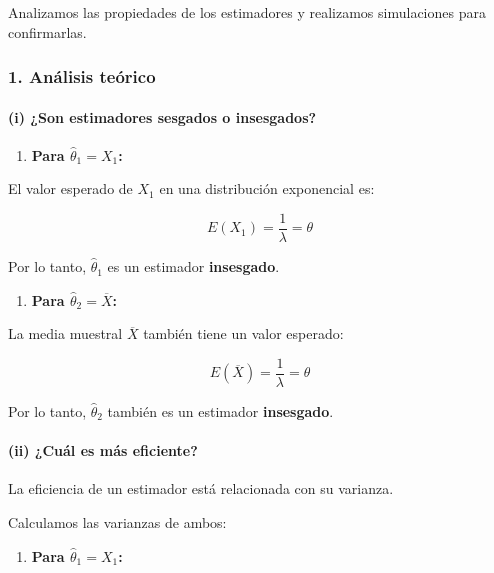 \documentclass[
]{article}
\providecommand{\tightlist}{%
  \setlength{\itemsep}{0pt}\setlength{\parskip}{0pt}}
\begin{document}
Analizamos las propiedades de los estimadores y realizamos simulaciones para confirmarlas.

\subsubsection{1. Análisis teórico}\label{anuxe1lisis-teuxf3rico}

\paragraph{(i) ¿Son estimadores sesgados o insesgados?}\label{i-son-estimadores-sesgados-o-insesgados}

\begin{enumerate}
\def\labelenumi{\arabic{enumi}.}
\tightlist
\item
  \textbf{Para \(\hat\theta_1 = X_1\):}
\end{enumerate}

El valor esperado de \(X_1\) en una distribución exponencial es:

\[
E(X_1) = \frac{1}{\lambda} = \theta
\]

Por lo tanto, \(\hat\theta_1\) es un estimador \textbf{insesgado}.

\begin{enumerate}
\def\labelenumi{\arabic{enumi}.}
\setcounter{enumi}{1}
\tightlist
\item
  \textbf{Para \(\hat\theta_2 = \overline{X}\):}
\end{enumerate}

La media muestral \(\overline{X}\) también tiene un valor esperado:

\[
E(\overline{X}) = \frac{1}{\lambda} = \theta
\]

Por lo tanto, \(\hat\theta_2\) también es un estimador \textbf{insesgado}.

\paragraph{(ii) ¿Cuál es más eficiente?}\label{ii-cuuxe1l-es-muxe1s-eficiente}

La eficiencia de un estimador está relacionada con su varianza.

Calculamos las varianzas de ambos:

\begin{enumerate}
\def\labelenumi{\arabic{enumi}.}
\tightlist
\item
  \textbf{Para \(\hat\theta_1 = X_1\):}
\end{enumerate}
\end{document}

